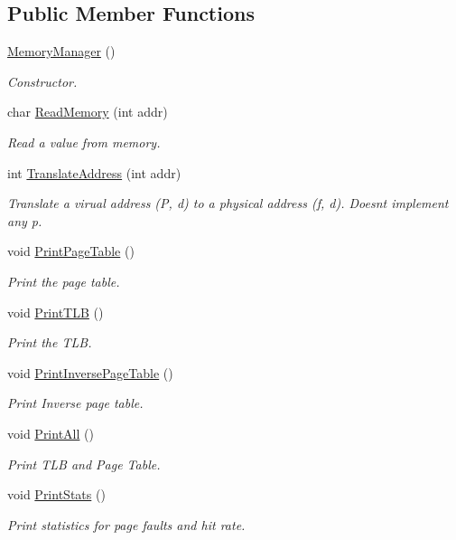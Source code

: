 \subsection*{Public Member Functions}
\begin{DoxyCompactItemize}
\item 
\hyperlink{classMemoryManager_ae925e8ad4d8fe6f0565e9d5729f59593}{Memory\+Manager} ()
\begin{DoxyCompactList}\small\item\em Constructor. \end{DoxyCompactList}\item 
char \hyperlink{classMemoryManager_a4a716fc46ee321ebb25bd54bcc9d0524}{Read\+Memory} (int addr)
\begin{DoxyCompactList}\small\item\em Read a value from memory. \end{DoxyCompactList}\item 
int \hyperlink{classMemoryManager_a905ceff7ad39c05c2d965af613156547}{Translate\+Address} (int addr)
\begin{DoxyCompactList}\small\item\em Translate a virual address (P, d) to a physical address (f, d). Doesn\textquotesingle{}t implement any p. \end{DoxyCompactList}\item 
void \hyperlink{classMemoryManager_aa7437efdc1ebd09895d451e2c521857a}{Print\+Page\+Table} ()
\begin{DoxyCompactList}\small\item\em Print the page table. \end{DoxyCompactList}\item 
void \hyperlink{classMemoryManager_a4bc5f491976e5253bf00a07a71b55ef6}{Print\+T\+LB} ()
\begin{DoxyCompactList}\small\item\em Print the T\+LB. \end{DoxyCompactList}\item 
void \hyperlink{classMemoryManager_a231141529c907c50de129169f16bedf1}{Print\+Inverse\+Page\+Table} ()
\begin{DoxyCompactList}\small\item\em Print Inverse page table. \end{DoxyCompactList}\item 
void \hyperlink{classMemoryManager_ae7bbb5231788516ca34caca3d428b0ef}{Print\+All} ()
\begin{DoxyCompactList}\small\item\em Print T\+LB and Page Table. \end{DoxyCompactList}\item 
void \hyperlink{classMemoryManager_ad0c7c13901cb9c6844aebf6bf9238c47}{Print\+Stats} ()
\begin{DoxyCompactList}\small\item\em Print statistics for page faults and hit rate. \end{DoxyCompactList}\end{DoxyCompactItemize}


